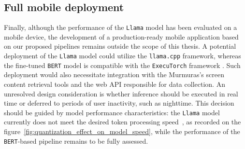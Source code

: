 \documentclass[licencjacka,en]{pracamgr}
\let\cleardoublepage\clearpage
\begin{document}
\subsection{Full mobile deployment}
Finally, although the performance of the \texttt{Llama} model has been evaluated on a mobile device, the development of a production-ready mobile application based on our proposed pipelines remains outside the scope of this thesis. A potential deployment of the \texttt{Llama} model could utilize the \texttt{llama.cpp} framework, whereas the fine-tuned \texttt{BERT} model is compatible with the \texttt{ExecuTorch} framework \cite{bert_executorch}. Such deployment would also necessitate integration with the Murmuras’s screen content retrieval tools and the web API responsible for data collection. An unresolved design consideration is whether inference should be executed in real time or deferred to periods of user inactivity, such as nighttime. This decision should be guided by model performance characteristics: the \texttt{Llama} model currently does not meet the desired token processing speed~\cite{token_performance}, as recorded on the figure~\ref{fig:quantization_effect_on_model_speed}, while the performance of the \texttt{BERT}-based pipeline remains to be fully assessed.

\let\cleardoublepage\clearpage
\end{document}
